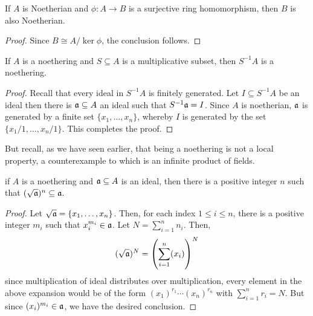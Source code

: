 \begin{lemma}
    If $A$ is Noetherian and $\phi: A\to B$ is a surjective ring homomorphism, then $B$ is also Noetherian.
\end{lemma}
\begin{proof}
    Since $B\cong A/\ker\phi$, the conclusion follows.
\end{proof}

\begin{proposition}
    If $A$ is a noethering and $S\subseteq A$ is a multiplicative subset, then $S^{-1}A$ is a noethering.
\end{proposition}
\begin{proof}
    Recall that every ideal in $S^{-1}A$ is finitely generated. Let $I\subseteq S^{-1}A$ be an ideal then there is $\mathfrak a\subseteq A$ an ideal such that $S^{-1}\mathfrak a = I$. Since $A$ is noetherian, $\mathfrak a$ is generated by a finite set $\{x_1,\ldots,x_n\}$, whereby $I$ is generated by the set $\{x_1/1,\ldots,x_n/1\}$. This completes the proof.
\end{proof}

But recall, as we have seen earlier, that being a noethering is not a local property, a counterexample to which is an infinite product of fields.

\begin{lemma}
    if $A$ is a noethering and $\mathfrak a\subseteq A$ is an ideal, then there is a positive integer $n$ such that $(\sqrt{\mathfrak a})^n\subseteq\mathfrak a$.
\end{lemma}
\begin{proof}
    Let $\sqrt{\mathfrak a} = \{x_1,\ldots,x_n\}$. Then, for each index $1\le i\le n$, there is a positive integer $m_i$ such that $x_i^{m_i}\in\mathfrak a$. Let $N = \sum_{i = 1}^n n_i$. Then,
    \begin{equation*}
        (\sqrt{\mathfrak a})^N = \left(\sum_{i = 1}^n(x_i)\right)^N
    \end{equation*}
    since multiplication of ideal distributes over multiplication, every element in the above expansion would be of the form $(x_1)^{r_1}\cdots(x_n)^{r_n}$ with $\sum_{i = 1}^n r_i = N$. But since $(x_i)^{m_i}\in\mathfrak a$, we have the desired conclusion.
\end{proof}

